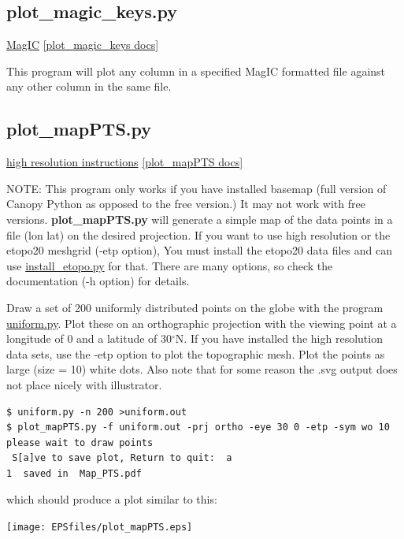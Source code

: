 \documentclass[11pt]{book}
\begin{document}
{{  

  \subsection{plot\_magic\_keys.py}
  \href{#MagIC}{MagIC}
  \href{https://github.com/PmagPy/PmagPy/blob/master/programs/plot_magic_keys.py}{[plot\_magic\_keys docs]}

  This program will plot any column in a specified MagIC formatted file against any other column in the same file.


  \subsection{plot\_mapPTS.py}
  \href{#hires}{high resolution instructions}
  \href{https://github.com/PmagPy/PmagPy/blob/master/programs/plot_mapPTS.py}{[plot\_mapPTS docs]}

NOTE:  This program only works if you have installed basemap (full version of Canopy Python as opposed to the free version.)  It may not work with  free versions.  {\bf plot\_mapPTS.py} will generate a simple map of the data points in a file (lon lat) on the desired projection.
If you want to use high resolution or the etopo20 meshgrid (-etp option), You must install the etopo20 data files and can use \href{#install_etopo.py}{install\_etopo.py}  for that.
 There are many options, so check the documentation (-h option) for details.

Draw a set of 200 uniformly distributed points on the globe with the program \href{#uniform.py}{uniform.py}.  Plot these on an orthographic projection with the viewing point at a longitude of 0 and a latitude of 30$^{\circ}$N.  If you have installed the high resolution data sets, use the -etp option to plot the topographic mesh.  Plot the points as large (size = 10) white dots.  Also note that for some reason the .svg output does not place nicely with illustrator.

\begin{verbatim}
$ uniform.py -n 200 >uniform.out
$ plot_mapPTS.py -f uniform.out -prj ortho -eye 30 0 -etp -sym wo 10
please wait to draw points
 S[a]ve to save plot, Return to quit:  a
1  saved in  Map_PTS.pdf
\end{verbatim}

which should produce a plot similar to this:

\texttt{[image: EPSfiles/plot\_mapPTS.eps]}




}}
\end{document}
